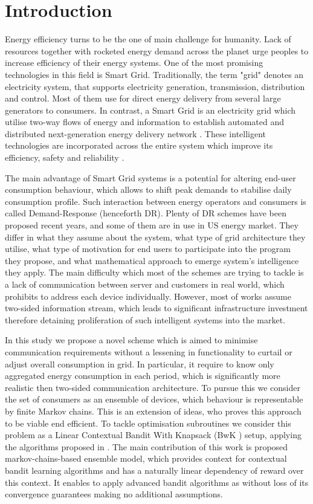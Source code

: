 \chapter{Introduction}
Energy efficiency turns to be the one of main challenge for humanity. Lack of resources together with rocketed energy demand across the planet urge peoples to increase efficiency of their energy systems. One of the most promising technologies in this field is Smart Grid. Traditionally, the term "grid" denotes an electricity system, that supports electricity generation, transmission, distribution and control. Most of them use for direct energy delivery from several large generators to consumers. In contrast, a Smart Grid is an electricity grid which utilise two-way flows of energy and information to establish automated and distributed next-generation energy delivery network \cite{Fang2012}. These intelligent technologies are incorporated across the entire system which improve its efficiency, safety and reliability \cite{Gao2012}. 

The main advantage of Smart Grid systems is a potential for altering end-user consumption behaviour, which allows to shift peak demands to stabilise daily consumption profile. Such interaction between energy operators and consumers is called Demand-Response (henceforth DR). Plenty of DR schemes have been proposed recent years, and some of them are in use in US energy market. They differ in what they assume about the system, what type of grid architecture they utilise, what type of motivation for end users to participate into the program they propose, and what mathematical approach to emerge system's intelligence they apply. The main difficulty which most of the schemes are trying to tackle is a lack of communication between server and customers in real world, which prohibits to address each device individually. However, most of works assume two-sided information stream, which leads to significant infrastructure investment therefore detaining proliferation of such intelligent systems into the market. 

In this study we propose a novel scheme which is aimed to minimise communication requirements without a lessening in functionality to curtail or adjust overall consumption in grid. In particular, it require to know only aggregated energy consumption in each period, which is significantly more realistic then two-sided communication architecture. To pursue this we consider the set of consumers as an ensemble of devices, which behaviour is representable by finite Markov chains. This is an extension of \cite{Chertkov2017} ideas, who proves this approach to be viable end efficient. To tackle optimisation subroutines we consider this problem as a Linear Contextual Bandit With Knapsack (BwK \cite{Badanidiyuru2013}) setup, applying the algorithms proposed in \cite{Agrawal2015}. The main contribution of this work is proposed markov-chains-based ensemble model, which provides context for contextual bandit learning algorithms and has a naturally linear dependency of reward over this context. It enables to apply advanced bandit algorithms as \cite{Agrawal2015} without loss of its convergence guarantees making no additional assumptions. 



